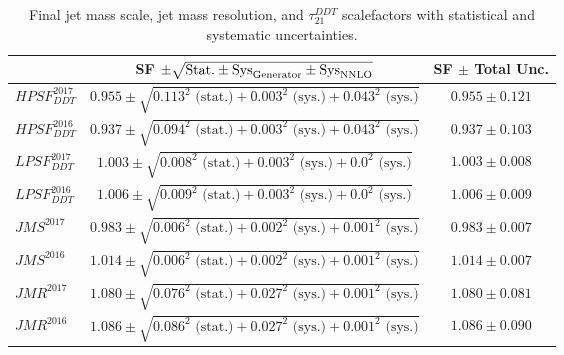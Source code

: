  \begin{table}[h!]
    \centering
     \begin{tabular}{|l|c|c|}
     \hline
      & SF $\pm \sqrt{\textrm{Stat.} \pm \textrm{Sys}_{\rm{Generator}} \pm \textrm{Sys}_{\rm{NNLO}}}$ & SF $\pm$ Total Unc. \\
    \hline
    $HPSF_{DDT}^{2017}$ &  $0.955 \pm \sqrt{0.113^2 \textrm{ (stat.)} + 0.003^2 \textrm{ (sys.)} + 0.043^2 \textrm{ (sys.)}}$  & $0.955 \pm 0.121$\\
    $HPSF_{DDT}^{2016}$ &  $0.937 \pm \sqrt{0.094^2 \textrm{ (stat.)} + 0.003^2 \textrm{ (sys.)} + 0.043^2 \textrm{ (sys.)}}$  & $0.937 \pm 0.103$\\
  \hline
    $LPSF_{DDT}^{2017}$ &  $1.003 \pm \sqrt{0.008^2 \textrm{ (stat.)} + 0.003^2 \textrm{ (sys.)} + 0.0^2 \textrm{ (sys.)}}$  & $1.003 \pm 0.008$\\
    $LPSF_{DDT}^{2016}$ &  $1.006 \pm \sqrt{0.009^2 \textrm{ (stat.)} + 0.003^2 \textrm{ (sys.)} + 0.0^2 \textrm{ (sys.)}}$  & $1.006 \pm 0.009$\\
     \hline
    $JMS^{2017}     $ &  $0.983 \pm \sqrt{0.006^2 \textrm{ (stat.)} + 0.002^2 \textrm{ (sys.)} + 0.001^2 \textrm{ (sys.)}}$ & $0.983 \pm 0.007$\\
    $JMS^{2016}     $ &  $1.014 \pm \sqrt{0.006^2 \textrm{ (stat.)} + 0.002^2 \textrm{ (sys.)} + 0.001^2 \textrm{ (sys.)}}$ & $1.014 \pm 0.007$\\
    \hline
    $JMR^{2017}     $ &  $1.080 \pm \sqrt{0.076^2 \textrm{ (stat.)} + 0.027^2 \textrm{ (sys.)} + 0.001^2 \textrm{ (sys.)}}$ & $1.080 \pm 0.081$\\
    $JMR^{2016}     $ &  $1.086 \pm \sqrt{0.086^2 \textrm{ (stat.)} + 0.027^2 \textrm{ (sys.)} + 0.001^2 \textrm{ (sys.)}}$ & $1.086 \pm 0.090$\\
    \hline
    \end{tabular}
       \caption{Final jet mass scale, jet mass resolution, and $\tau_{21}^{DDT}$ scalefactors with statistical and systematic uncertainties.}
       \label{tab:wsf_total}
    \end{table}
\clearpage
